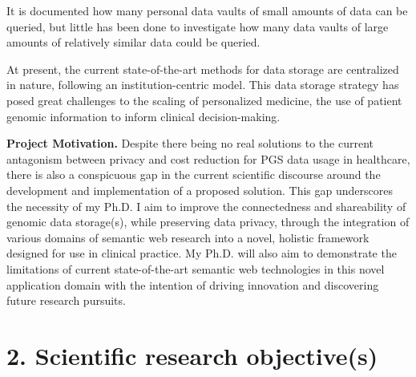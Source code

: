 \documentclass[a4paper,11pt]{article}
\begin{document}
It is documented how many personal data vaults of small amounts of data can be queried, but little has been done to investigate how many data vaults of large amounts of relatively similar data could be queried.

At present, the current state-of-the-art methods for data storage are centralized in nature, following an institution-centric model. 
This data storage strategy has posed great challenges to the scaling of personalized medicine, the use of patient genomic information to inform clinical decision-making.


\textbf{Project Motivation.}
Despite there being no real solutions to the current antagonism between privacy and cost reduction for PGS data usage in healthcare, there is also a conspicuous gap in the current scientific discourse around the development and implementation of a proposed solution. 
This gap underscores the necessity of my Ph.D.
I aim to improve the connectedness and shareability of genomic data storage(s), while preserving data privacy, through the integration of various domains of semantic web research into a novel, holistic framework designed for use in clinical practice. 
My Ph.D. will also aim to demonstrate the limitations of current state-of-the-art semantic web technologies in this novel application domain with the intention of driving innovation and discovering future research pursuits.



\section{2. Scientific research objective(s)}
\begin{comment}
Describe explicitly the scientific objective(s) and the research hypothesis. Explain whether and how the research is specifically challenging and inventive, describing in particular the innovative aspects of the envisaged results. Discuss in detail the results (or partial results) that you aim to achieve, such as specific knowledge, the solution to particular problems and academic breakthroughs.
\end{comment}
\end{document}
